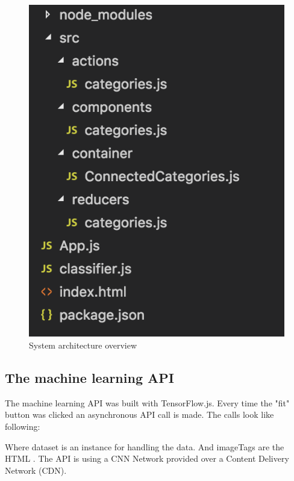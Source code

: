 \begin{figure}[H]
	\centering
	\includegraphics[scale=0.8]{bilder/cyto/SystemArchitecture.png}
	\caption{System architecture overview}
	\label{fig:SystemOverview}
\end{figure}


\subsection{The machine learning API}
The machine learning API was built with TensorFlow.js. Every time the "fit" button was clicked an asynchronous API call is made. The calls look like following:



Where dataset is an instance for handling the data. And imageTags are the HTML . The API is using a CNN Network provided over a Content Delivery Network (CDN).









